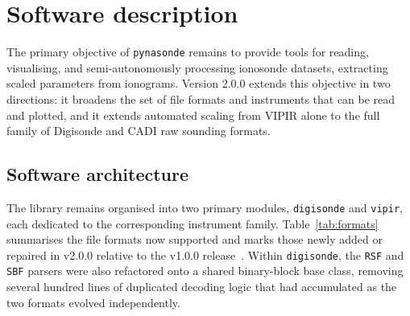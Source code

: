 \documentclass[12pt,a4paper]{article}
\begin{document}
\section{Software description}
\label{sec:software}

The primary objective of \texttt{pynasonde} remains to provide tools for
reading, visualising, and semi-autonomously processing ionosonde datasets,
extracting scaled parameters from ionograms. Version 2.0.0 extends this
objective in two directions: it broadens the set of file formats and
instruments that can be read and plotted, and it extends automated scaling
from VIPIR alone to the full family of Digisonde and CADI raw sounding
formats.

\subsection{Software architecture}
\label{ssec:architecture}

The library remains organised into two primary modules, \texttt{digisonde}
and \texttt{vipir}, each dedicated to the corresponding instrument family.
Table~\ref{tab:formats} summarises the file formats now supported and marks
those newly added or repaired in v2.0.0 relative to the v1.0.0
release~\cite{Chakraborty2026}. Within \texttt{digisonde}, the \texttt{RSF}
and \texttt{SBF} parsers were also refactored onto a shared binary-block
base class, removing several hundred lines of duplicated decoding logic that
had accumulated as the two formats evolved independently.
\end{document}
